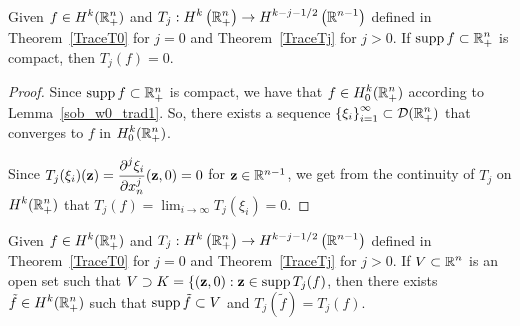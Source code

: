 \begin{prop} \label{sobTrace0K}
Given $\displaystyle f \in H^k(\mathbb{R}^n_+)$ and
$\displaystyle T_j:H^k\left(\mathbb{R}^n_+\right) \to
H^{k-j-1/2}\left(\mathbb{R}^{n-1}\right)$
defined in Theorem~\ref{TraceT0} for $j=0$ and Theorem~\ref{TraceTj}
for $j>0$.  If $\displaystyle \operatorname{supp} f \subset \mathbb{R}^n_+$ is compact,
then $T_j(f) = 0$.  
\end{prop}

\begin{proof}
Since $\operatorname{supp} f \subset \mathbb{R}^n_+$ is compact, we have that
$\displaystyle f \in H^k_0(\mathbb{R}^n_+)$ according to Lemma~\ref{sob_w0_trad1}.
So, there exists a sequence
$\displaystyle \left\{ \xi_i \right\}_{i=1}^\infty \subset \mathcal{D}(\mathbb{R}^n_+)$
that converges to $f$ in $\displaystyle H^k_0(\mathbb{R}^n_+)$.

Since
$\displaystyle T_j(\xi_i)(\mathbf{z}) = \frac{\displaystyle \partial^{j}{\xi_i}} {\displaystyle \partial x_n^{j}}(\mathbf{z},0) = 0$
for $\mathbf{z} \in \mathbb{R}^{n-1}$, we get from the continuity of $T_j$ on
$\displaystyle H^k(\mathbb{R}^n_+)$ that
$\displaystyle T_j(f) = \lim_{i\to \infty} T_j(\xi_i) = 0$.
\end{proof}

\begin{prop} \label{sobTjDomain}
Given $\displaystyle f \in H^k(\mathbb{R}^n_+)$ and
$\displaystyle T_j:H^k\left(\mathbb{R}^n_+\right) \to H^{k-j-1/2}\left(\mathbb{R}^{n-1}\right)$
defined in Theorem~\ref{TraceT0} for $j=0$ and Theorem~\ref{TraceTj}
for $j>0$.  If $\displaystyle V \subset \mathbb{R}^n$ is an open set such that
$V \supset K = \{ (\mathbf{z},0) : \mathbf{z} \in \operatorname{supp} T_j(f)$, then there
exists $\displaystyle \tilde{f} \in H^k(\mathbb{R}^n_+)$ such that
$\operatorname{supp} \tilde{f} \subset V$ and $T_j(\tilde{f}) = T_j(f)$.
\end{prop}

